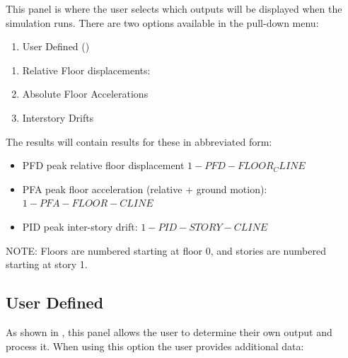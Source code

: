This panel is where the user selects which outputs will be displayed when
the simulation runs. There are two options available in the pull-down
menu:
\begin{enumerate}
\item User Defined ()
\end{enumerate}

\begin{enumerate}
\item Relative Floor displacements:
\item Absolute Floor Accelerations
\item Interstory Drifts
\end{enumerate}

The results will contain results for these in abbreviated form:
\begin{itemize}
\item PFD peak relative floor displacement $1-PFD-FLOOR_CLINE$
\item PFA peak floor acceleration (relative + ground motion):
  $1-PFA-FLOOR-CLINE$
\item PID peak inter-story drift: $1-PID-STORY-CLINE$
\end{itemize}

NOTE: Floors are numbered starting at floor 0, and stories are numbered starting at story 1.

\subsection{User Defined}\label{subsec:sectionUserDefined}
As shown in , this panel allows the user to determine their own output and process it. When using this option the user provides additional data:

